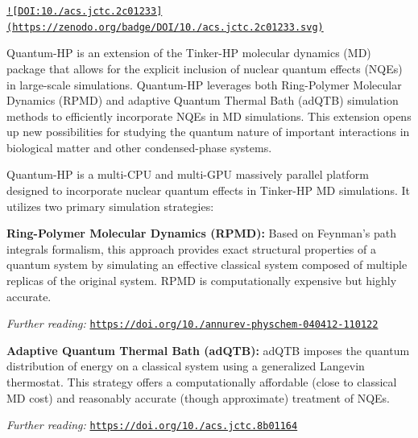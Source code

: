 \href{https://doi.org/10.1021/acs.jctc.2c01233}{\tt !\mbox{[}D\-O\-I\-:10./acs.jctc.\-2c01233\mbox{]}(https\-://zenodo.\-org/badge/\-D\-O\-I/10./acs.\-jctc.\-2c01233.\-svg)}

Quantum-\/\-H\-P is an extension of the Tinker-\/\-H\-P molecular dynamics (M\-D) package that allows for the explicit inclusion of nuclear quantum effects (N\-Q\-Es) in large-\/scale simulations. Quantum-\/\-H\-P leverages both Ring-\/\-Polymer Molecular Dynamics (R\-P\-M\-D) and adaptive Quantum Thermal Bath (ad\-Q\-T\-B) simulation methods to efficiently incorporate N\-Q\-Es in M\-D simulations. This extension opens up new possibilities for studying the quantum nature of important interactions in biological matter and other condensed-\/phase systems. 



Quantum-\/\-H\-P is a multi-\/\-C\-P\-U and multi-\/\-G\-P\-U massively parallel platform designed to incorporate nuclear quantum effects in Tinker-\/\-H\-P M\-D simulations. It utilizes two primary simulation strategies\-:


\begin{DoxyEnumerate}
\item {\bfseries Ring-\/\-Polymer Molecular Dynamics (R\-P\-M\-D)\-:} Based on Feynman's path integrals formalism, this approach provides exact structural properties of a quantum system by simulating an effective classical system composed of multiple replicas of the original system. R\-P\-M\-D is computationally expensive but highly accurate.
\begin{DoxyItemize}
\item {\itshape Further reading\-:} \href{https://doi.org/10.1146/annurev-physchem-040412-110122}{\tt https\-://doi.\-org/10./annurev-\/physchem-\/040412-\/110122}
\end{DoxyItemize}
\item {\bfseries Adaptive Quantum Thermal Bath (ad\-Q\-T\-B)\-:} ad\-Q\-T\-B imposes the quantum distribution of energy on a classical system using a generalized Langevin thermostat. This strategy offers a computationally affordable (close to classical M\-D cost) and reasonably accurate (though approximate) treatment of N\-Q\-Es.
\begin{DoxyItemize}
\item {\itshape Further reading\-:} \href{https://doi.org/10.1021/acs.jctc.8b01164}{\tt https\-://doi.\-org/10./acs.\-jctc.\-8b01164} 


\end{DoxyItemize}
\end{DoxyEnumerate}


